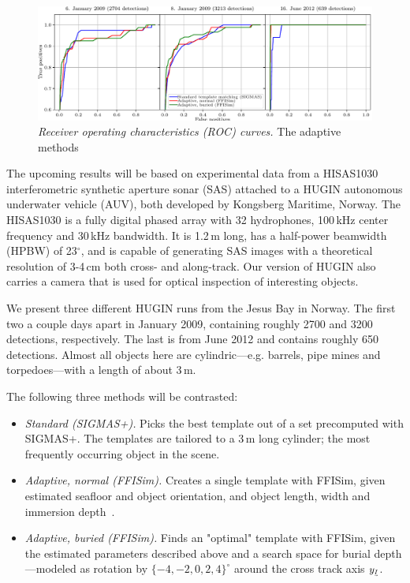 \begin{figure}[t]\centering%
\includegraphics[width=\linewidth]{gfx/fig_rocs.pdf}%
\caption{\emph{Receiver operating characteristics (ROC) curves.} The adaptive methods }\label{IV_fig_roc_curves}%
\end{figure}

The upcoming results will be based on experimental data from a HISAS1030 interferometric synthetic aperture sonar (SAS) attached to a HUGIN autonomous underwater vehicle (AUV), both developed by Kongsberg Maritime, Norway. The HISAS1030 is a fully digital phased array with 32 hydrophones, 100\,kHz center frequency and 30\,kHz bandwidth. It is 1.2\,m long, has a half-power beamwidth (HPBW) of 23$^\circ$, and is capable of generating SAS images with a theoretical resolution of 3-4\,cm both cross- and along-track. Our version of HUGIN also carries a camera that is used for optical inspection of interesting objects.


We present three different HUGIN runs from the Jesus Bay in Norway. The first two a couple days apart in January 2009, containing roughly 2700 and 3200 detections, respectively. The last is from June 2012 and contains roughly 650 detections. Almost all objects here are cylindric---e.g. barrels, pipe mines and torpedoes---with a length of about 3\,m.

The following three methods will be contrasted:
%
\begin{itemize}
\item \emph{Standard (SIGMAS+).} Picks the best template out of a set precomputed with SIGMAS+. The templates are tailored to a 3\,m long cylinder; the most frequently occurring object in the scene.
\item \emph{Adaptive, normal (FFISim).} Creates a single template with FFISim, given estimated seafloor and object orientation, and object length, width and immersion depth~\cite{Midelfart2010}. 
\item \emph{Adaptive, buried (FFISim).} Finds an "optimal" template with FFISim, given the estimated parameters described above and a search space for burial depth---modeled as rotation by $\{-4,-2,0,2,4\}^\circ$ around the cross track axis $y_\textrm{\tiny$\uvec{I}$}$.
\end{itemize}

